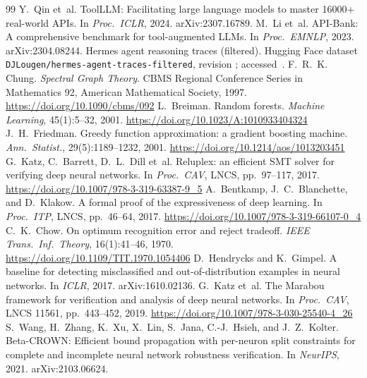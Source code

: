 \documentclass[10pt,twocolumn,letterpaper]{article}
\begin{document}
\begin{thebibliography}{99}
 Y.~Qin et~al. ToolLLM: Facilitating large language models to master 16000+ real-world APIs. In \emph{Proc.\ ICLR}, 2024. arXiv:2307.16789.
 M.~Li et~al. API-Bank: A comprehensive benchmark for tool-augmented LLMs. In \emph{Proc.\ EMNLP}, 2023. arXiv:2304.08244.
 Hermes agent reasoning traces (filtered). Hugging Face dataset \texttt{DJLougen/hermes-agent-traces-filtered}, revision \texttt{\numHermesDatasetRevFull{}}; accessed~\numHermesDatasetAccess{}.
 F.~R.~K. Chung. \emph{Spectral Graph Theory}. CBMS Regional Conference Series in Mathematics 92, American Mathematical Society, 1997. \url{https://doi.org/10.1090/cbms/092}
 L.~Breiman. Random forests. \emph{Machine Learning}, 45(1):5--32, 2001. \url{https://doi.org/10.1023/A:1010933404324}
 J.~H.~Friedman. Greedy function approximation: a gradient boosting machine. \emph{Ann.\ Statist.}, 29(5):1189--1232, 2001. \url{https://doi.org/10.1214/aos/1013203451}
 G.~Katz, C.~Barrett, D.~L.~Dill et~al. Reluplex: an efficient SMT solver for verifying deep neural networks. In \emph{Proc.\ CAV}, LNCS, pp.~97--117, 2017. \url{https://doi.org/10.1007/978-3-319-63387-9_5}
 A.~Bentkamp, J.~C.~Blanchette, and D.~Klakow. A formal proof of the expressiveness of deep learning. In \emph{Proc.\ ITP}, LNCS, pp.~46--64, 2017. \url{https://doi.org/10.1007/978-3-319-66107-0_4}
 C.~K.~Chow. On optimum recognition error and reject tradeoff. \emph{IEEE Trans.\ Inf.\ Theory}, 16(1):41--46, 1970. \url{https://doi.org/10.1109/TIT.1970.1054406}
 D.~Hendrycks and K.~Gimpel. A baseline for detecting misclassified and out-of-distribution examples in neural networks. In \emph{ICLR}, 2017. arXiv:1610.02136.
 G.~Katz et~al. The Marabou framework for verification and analysis of deep neural networks. In \emph{Proc.\ CAV}, LNCS 11561, pp.~443--452, 2019. \url{https://doi.org/10.1007/978-3-030-25540-4_26}
 S.~Wang, H.~Zhang, K.~Xu, X.~Lin, S.~Jana, C.-J.~Hsieh, and J.~Z.~Kolter. Beta-CROWN: Efficient bound propagation with per-neuron split constraints for complete and incomplete neural network robustness verification. In \emph{NeurIPS}, 2021. arXiv:2103.06624.
\end{thebibliography}

\appendix
\end{document}
